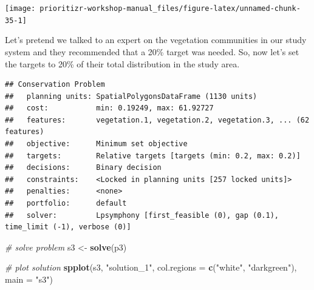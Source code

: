 \documentclass[12pt,]{book}
\newenvironment{Shaded}{\begin{snugshade}}{\end{snugshade}}
\newcommand{\KeywordTok}[1]{\textcolor[rgb]{0.13,0.29,0.53}{\textbf{#1}}}
\newcommand{\DataTypeTok}[1]{\textcolor[rgb]{0.13,0.29,0.53}{#1}}
\newcommand{\FloatTok}[1]{\textcolor[rgb]{0.00,0.00,0.81}{#1}}
\newcommand{\StringTok}[1]{\textcolor[rgb]{0.31,0.60,0.02}{#1}}
\newcommand{\CommentTok}[1]{\textcolor[rgb]{0.56,0.35,0.01}{\textit{#1}}}
\newcommand{\OtherTok}[1]{\textcolor[rgb]{0.56,0.35,0.01}{#1}}
\newcommand{\OperatorTok}[1]{\textcolor[rgb]{0.81,0.36,0.00}{\textbf{#1}}}
\newcommand{\NormalTok}[1]{#1}
\begin{document}
\begin{center}\texttt{[image: prioritizr-workshop-manual\_files/figure-latex/unnamed-chunk-35-1]} \end{center}

Let's pretend we talked to an expert on the vegetation communities in
our study system and they recommended that a 20\% target was needed. So,
now let's set the targets to 20\% of their total distribution in the
study area.

\begin{Shaded}
\end{Shaded}

\begin{verbatim}
## Conservation Problem
##   planning units: SpatialPolygonsDataFrame (1130 units)
##   cost:           min: 0.19249, max: 61.92727
##   features:       vegetation.1, vegetation.2, vegetation.3, ... (62 features)
##   objective:      Minimum set objective 
##   targets:        Relative targets [targets (min: 0.2, max: 0.2)]
##   decisions:      Binary decision 
##   constraints:    <Locked in planning units [257 locked units]>
##   penalties:      <none>
##   portfolio:      default
##   solver:         Lpsymphony [first_feasible (0), gap (0.1), time_limit (-1), verbose (0)]
\end{verbatim}

\begin{Shaded}
\begin{Highlighting}[]
\CommentTok{# solve problem}
\NormalTok{s3 <-}\StringTok{ }\KeywordTok{solve}\NormalTok{(p3)}

\CommentTok{# plot solution}
\KeywordTok{spplot}\NormalTok{(s3, }\StringTok{"solution_1"}\NormalTok{, }\DataTypeTok{col.regions =} \KeywordTok{c}\NormalTok{(}\StringTok{"white"}\NormalTok{, }\StringTok{"darkgreen"}\NormalTok{), }\DataTypeTok{main =} \StringTok{"s3"}\NormalTok{)}
\end{Highlighting}
\end{Shaded}
\end{document}
